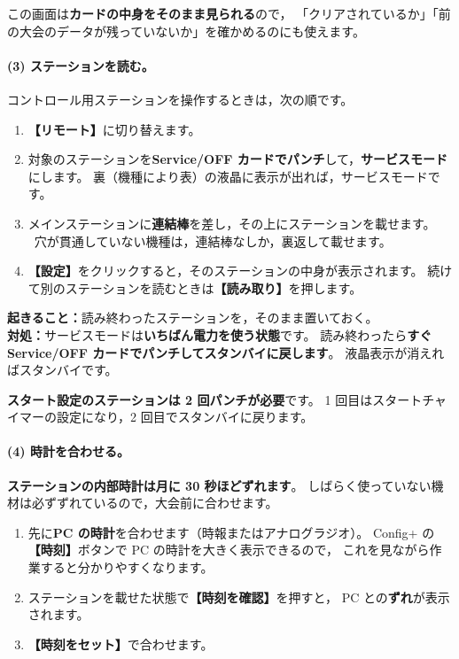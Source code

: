 この画面は\textbf{カードの中身をそのまま見られる}ので，
「クリアされているか」「前の大会のデータが残っていないか」を確かめるのにも使えます。

\paragraph{(3) ステーションを読む。}
コントロール用ステーションを操作するときは，次の順です。

\begin{enumerate}
\item \textbf{【リモート】}に切り替えます。
\item 対象のステーションを\textbf{Service/OFF カードでパンチ}して，\textbf{サービスモード}にします。
      裏（機種により表）の液晶に表示が出れば，サービスモードです。
\item メインステーションに\textbf{連結棒}を差し，その上にステーションを載せます。\\
      \tSI\ 穴が貫通していない機種は，連結棒なしか，裏返して載せます。
\item \textbf{【設定】}をクリックすると，そのステーションの中身が表示されます。
      続けて別のステーションを読むときは\textbf{【読み取り】}を押します。
\end{enumerate}

\begin{Fail}
\textbf{起きること：}読み終わったステーションを，そのまま置いておく。\\
\textbf{対処：}サービスモードは\textbf{いちばん電力を使う状態}です。
読み終わったら\textbf{すぐ Service/OFF カードでパンチしてスタンバイに戻します}。
液晶表示が消えればスタンバイです。

\textbf{スタート設定のステーションは 2 回パンチが必要}です。
1 回目はスタートチャイマーの設定になり，2 回目でスタンバイに戻ります。
\end{Fail}

\paragraph{(4) 時計を合わせる。}
\textbf{ステーションの内部時計は月に 30 秒ほどずれます}。
しばらく使っていない機材は必ずずれているので，大会前に合わせます。

\begin{enumerate}
\item 先に\textbf{PC の時計}を合わせます（時報またはアナログラジオ）。
      Config+ の\textbf{【時刻】}ボタンで PC の時計を大きく表示できるので，
      これを見ながら作業すると分かりやすくなります。
\item ステーションを載せた状態で\textbf{【時刻を確認】}を押すと，
      PC との\textbf{ずれ}が表示されます。
\item \textbf{【時刻をセット】}で合わせます。
\end{enumerate}

